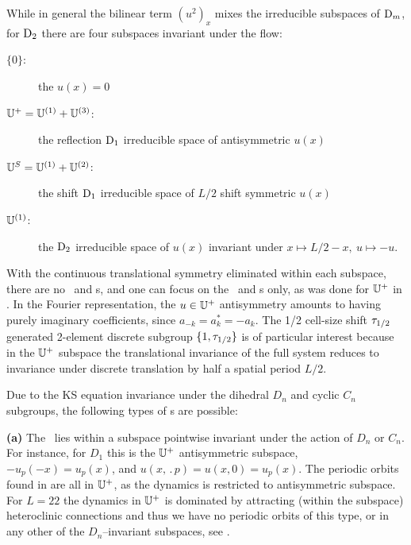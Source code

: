 \begin{description}
While in general the bilinear term $(u^2)_x$  mixes the
irreducible subspaces of $\textrm{D}_{m}$, for $\textrm{D}_{2}$ there are
four subspaces invariant under the flow:
\begin{description}
 \item[$\{0\}$:~~~~~~] the $u(x)=0$ {\eqv}
 \item[$\mathbb{U}^+ = \mathbb{U}^{(1)}+ \mathbb{U}^{(3)} $:]
    the reflection $\textrm{D}_{1}$ irreducible space of antisymmetric $u(x)$
 \item[$\mathbb{U}^S =  \mathbb{U}^{(1)}+ \mathbb{U}^{(2)}$:]
    the shift $\textrm{D}_{1}$ irreducible space of $L/2$ shift symmetric  $u(x)$
 \item[$\mathbb{U}^{(1)}$:~~~~~]
    the $\textrm{D}_{2}$ irreducible  space of $u(x)$ invariant under $x\mapsto L/2-x,\ u\mapsto -u$.
\end{description}
With the continuous
translational symmetry eliminated within each subspace, there are no
\reqva\ and \rpo s, and one
can focus on the \eqva\ and \po s only, as was done
for $\mathbb{U}^+$ in .
In the Fourier
representation, the
$u \in \mathbb{U}^+$
antisymmetry amounts to having purely imaginary
coefficients, since $a_{-k}= a^\ast_k = -a_k$.
The 1/2 cell-size shift $\tau_{1/2}$
generated 2-element discrete subgroup
$\{1,\tau_{1/2}\}$ is
of particular interest
because in the $\mathbb{U}^+$ subspace the translational invariance of the full system reduces to
invariance under discrete translation  by half a
spatial period $L/2$.

Due to the KS equation invariance under
the dihedral $D_n$ and cyclic $C_n$ subgroups, the following
types of \po s are possible:

{\bf (a)} The \po\ lies
within a subspace pointwise invariant under the action of
$D_n$ or $C_n$. For instance, for $D_1$ this is the
$\mathbb{U}^+$ antisymmetric subspace, $-u_p(-x) = u_p(x)$, and
$u(x,\period{p}) = u(x,0) = u_p(x)$. The periodic orbits
found in  are
all in $\mathbb{U}^+$, as the dynamics is restricted to
antisymmetric subspace. For $L=22$ the dynamics in $\mathbb{U}^+$
is dominated by attracting (within the subspace)
heteroclinic connections and thus we have no periodic orbits
of this type, or in any other of the $D_n$--invariant
subspaces, see . %


\end{description}
